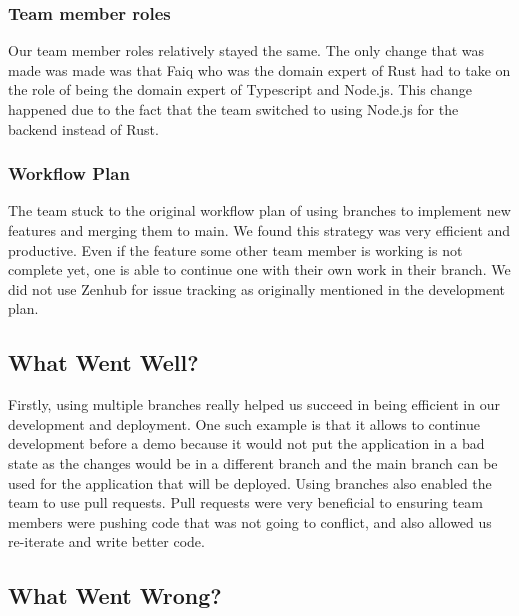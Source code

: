 \documentclass{article}
\begin{document}
	\subsubsection{Team member roles}
	
	Our team member roles relatively stayed the same. The only change that was made was made was that Faiq who was the domain expert of Rust had to take on the role of being the domain expert of Typescript and Node.js. This change happened due to the fact that the team switched to using Node.js for the backend instead of Rust.\\
	
	\subsubsection{Workflow Plan}
	
	The team stuck to the original workflow plan of using branches to implement new features and merging them to main. We found this strategy was very efficient and productive. Even if the feature some other team member is working is not complete yet, one is able to continue one with their own work in their branch. We did not use Zenhub for issue tracking as originally mentioned in the development plan.
	
	
	\subsection{What Went Well?}
	
	Firstly, using multiple branches really helped us succeed in being efficient in our development and deployment. One such example is that it allows to continue development before a demo because it would not put the application in a bad state as the changes would be in a different branch and the main branch can be used for the application that will be deployed. Using branches also enabled the team to use pull requests. Pull requests were very beneficial to ensuring team members were pushing code that was not going to conflict, and also allowed us re-iterate and write better code.
	
	\subsection{What Went Wrong?}
	
\end{document}
